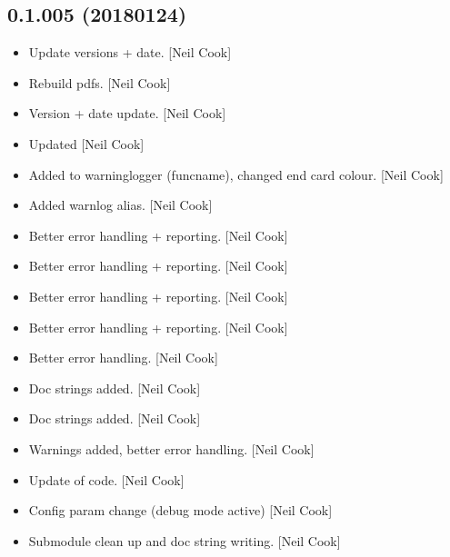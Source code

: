 \documentclass[a4paper,10pt,english]{report}
\begin{document}
\subsection{0.1.005 (2018\sphinxhyphen{}01\sphinxhyphen{}24)}
\label{\detokenize{misc/changelog:id517}}\begin{itemize}
\item {} 
Update versions + date. {[}Neil Cook{]}

\item {} 
Rebuild pdfs. {[}Neil Cook{]}

\item {} 
Version + date update. {[}Neil Cook{]}

\item {} 
Updated  {[}Neil Cook{]}

\item {} 
Added to warninglogger (funcname), changed end card colour. {[}Neil
Cook{]}

\item {} 
Added warnlog alias. {[}Neil Cook{]}

\item {} 
Better error handling + reporting. {[}Neil Cook{]}

\item {} 
Better error handling + reporting. {[}Neil Cook{]}

\item {} 
Better error handling + reporting. {[}Neil Cook{]}

\item {} 
Better error handling + reporting. {[}Neil Cook{]}

\item {} 
Better error handling. {[}Neil Cook{]}

\item {} 
Doc strings added. {[}Neil Cook{]}

\item {} 
Doc strings added. {[}Neil Cook{]}

\item {} 
Warnings added, better error handling. {[}Neil Cook{]}

\item {} 
Update of code. {[}Neil Cook{]}

\item {} 
Config param change (debug mode active) {[}Neil Cook{]}

\item {} 
Submodule clean up and doc string writing. {[}Neil Cook{]}


\end{itemize}
\end{document}
